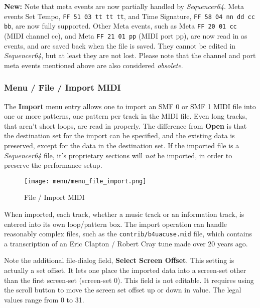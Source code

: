    \textbf{New:}
   Note that meta events are now partially handled by \textsl{Sequencer64}.
   Meta events Set Tempo, \texttt{FF 51 03 tt tt tt},
   and Time Signature, \texttt{FF 58 04 nn dd cc bb}, are now fully supported.
   Other Meta events,
   such as Meta \texttt{FF 20 01 cc} (MIDI channel cc),
   and Meta \texttt{FF 21 01 pp} (MIDI port pp),
   are now read in as events, and are saved back when the file is saved.
   They cannot be edited in \textsl{Sequencer64}, but at least they are
   not lost.
   Please note that the channel and port meta events mentioned above are also
   considered \textsl{obsolete}.

\subsubsection{Menu / File / Import MIDI}
\label{subsubsec:seq64_menu_file_import}

   The \textbf{Import} menu entry allows one to import an SMF 0
   or SMF 1 MIDI file into one or more patterns, one pattern per track in
   the MIDI file.  Even long tracks, that aren't short loops, are read in
   properly.  The difference from \textbf{Open} is that the destination set
   for the import can be specified, and the existing data is preserved, except
   for the data in the destination set.  If the imported file is a
   \textsl{Sequencer64} file, it's proprietary sections will
   \textsl{not} be imported, in order to preserve the performance setup.

\begin{figure}[H]
   \centering 
   \texttt{[image: menu/menu\_file\_import.png]}
   \caption{File / Import MIDI}
   \label{fig:seq64_menu_file_import}
\end{figure}

   When imported, each track, whether a music track or an information track,
   is entered into its own loop/pattern box.  The import operation can
   handle reasonably complex files,
   such as the \texttt{contrib/b4uacuse.mid} file, which contains
   a transcription of an Eric Clapton / Robert Cray tune made over 20 years ago.

   Note the additional file-dialog field,
   \textbf{Select Screen Offset}.
   This setting is actually a set offset.
   It lets one place the imported data into a screen-set other than
   the first screen-set (screen-set 0).
   This field is not editable.  It requires using the scroll button to move the
   screen set offset up or down in value.  The legal values range from 0
   to 31.

